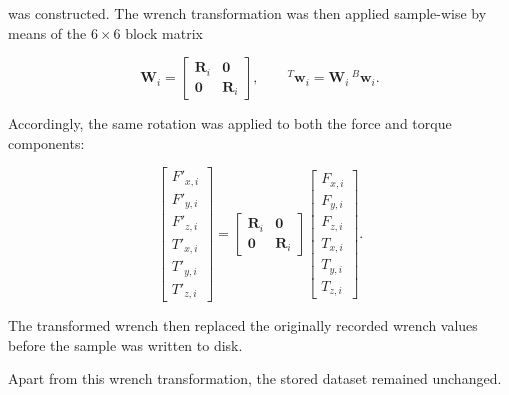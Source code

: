 was constructed. The wrench transformation was then applied sample-wise by means of the $6\times6$ block matrix

\begin{equation}
    \mathbf{W}_i =
    \begin{bmatrix}
    \mathbf{R}_i & \mathbf{0} \\
    \mathbf{0}   & \mathbf{R}_i
    \end{bmatrix},
    \qquad
    {}^{T}\mathbf{w}_i = \mathbf{W}_i\,{}^{B}\mathbf{w}_i.
    \label{eq:wrench_4}
\end{equation}

Accordingly, the same rotation was applied to both the force and torque components:

\begin{equation}
    \begin{bmatrix}
    F'_{x,i} \\ F'_{y,i} \\ F'_{z,i} \\ T'_{x,i} \\ T'_{y,i} \\ T'_{z,i}
    \end{bmatrix}
    =
    \begin{bmatrix}
    \mathbf{R}_i & \mathbf{0} \\
    \mathbf{0}   & \mathbf{R}_i
    \end{bmatrix}
    \begin{bmatrix}
    F_{x,i} \\ F_{y,i} \\ F_{z,i} \\ T_{x,i} \\ T_{y,i} \\ T_{z,i}
    \end{bmatrix}.
    \label{eq:wrench_5}
\end{equation}

The transformed wrench then replaced the originally recorded wrench values before the sample was written to disk.

Apart from this wrench transformation, the stored dataset remained unchanged.